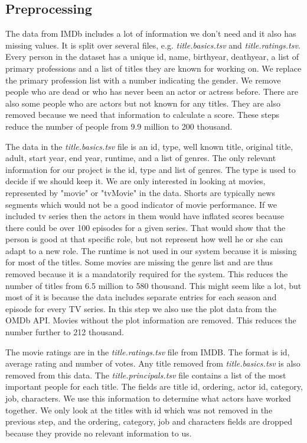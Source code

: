 \subsection{Preprocessing}

The data from IMDb includes a lot of information we don’t need and it also has missing values. It is split over several files, e.g. \textit{title.basics.tsv} and \textit{title.ratings.tsv}. Every person in the dataset has a unique id, name, birthyear, deathyear, a list of primary professions and a list of titles they are known for working on. We replace the primary profession list with a number indicating the gender. We remove people who are dead or who has never been an actor or actress before. There are also some people who are actors but not known for any titles. They are also removed because we need that information to calculate a score. These steps reduce the number of people from 9.9 million to 200 thousand.

The data in the \textit{title.basics.tsv} file is an id, type, well known title, original title, adult, start year, end year, runtime, and a list of genres. The only relevant information for our project is the id, type and list of genres. The type is used to decide if we should keep it. We are only interested in looking at movies, represented by "movie" or "tvMovie" in the data. Shorts are typically news segments which would not be a good indicator of movie performance. If we included tv series then the actors in them would have inflated scores because there could be over 100 episodes for a given series. That would show that the person is good at that specific role, but not represent how well he or she can adapt to a new role. The runtime is not used in our system because it is missing for most of the titles. Some movies are missing the genre list and are thus removed because it is a mandatorily required for the system. This reduces the number of titles from 6.5 million to 580 thousand. This might seem like a lot, but most of it is because the data includes separate entries for each season and episode for every TV series. In this step we also use the plot data from the OMDb API. Movies without the plot information are removed. This reduces the number further to 212 thousand.

The movie ratings are in the \textit{title.ratings.tsv} file from IMDB. The format is id, average rating and number of votes. Any title removed from \textit{title.basics.tsv} is also removed from this data. The \textit{title.principals.tsv} file contains a list of the most important people for each title. The fields are title id, ordering, actor id, category, job, characters. We use this information to determine what actors have worked together. We only look at the titles with id which was not removed in the previous step, and the ordering, category, job and characters fields are dropped because they provide no relevant information to us.


